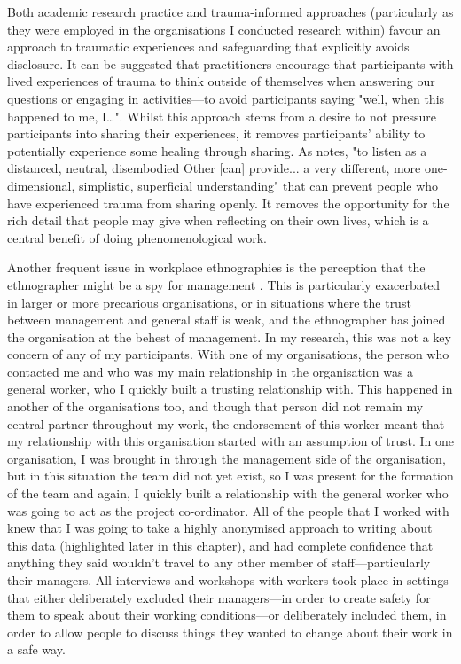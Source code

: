 Both academic research practice and trauma-informed approaches (particularly as they were employed in the organisations I conducted research within) favour an approach to traumatic experiences and safeguarding that explicitly avoids disclosure. It can be suggested that practitioners encourage that participants with lived experiences of trauma to think outside of themselves when answering our questions or engaging in activities—to avoid participants saying "well, when this happened to me, I…". Whilst this approach stems from a desire to not pressure participants into sharing their experiences, it removes participants' ability to potentially experience some healing through sharing. As \citet[p. 56]{carless_narrating_2016} notes, "to listen as a distanced, neutral, disembodied Other [can] provide... a very different, more one-dimensional, simplistic, superficial understanding" that can prevent people who have experienced trauma from sharing openly. It removes the opportunity for the rich detail that people may give when reflecting on their own lives, which is a central benefit of doing phenomenological work.

Another frequent issue in workplace ethnographies is the perception that the ethnographer might be a spy for management \citep{baum-talmor_its_2019}. This is particularly exacerbated in larger or more precarious organisations, or in situations where the trust between management and general staff is weak, and the ethnographer has joined the organisation at the behest of management. In my research, this was not a key concern of any of my participants. With one of my organisations, the person who contacted me and who was my main relationship in the organisation was a general worker, who I quickly built a trusting relationship with. This happened in another of the organisations too, and though that person did not remain my central partner throughout my work, the endorsement of this worker meant that my relationship with this organisation started with an assumption of trust. In one organisation, I was brought in through the management side of the organisation, but in this situation the team did not yet exist, so I was present for the formation of the team and again, I quickly built a relationship with the general worker who was going to act as the project co-ordinator. All of the people that I worked with knew that I was going to take a highly anonymised approach to writing about this data (highlighted later in this chapter), and had complete confidence that anything they said wouldn’t travel to any other member of staff—particularly their managers. All interviews and workshops with workers took place in settings that either deliberately excluded their managers—in order to create safety for them to speak about their working conditions—or deliberately included them, in order to allow people to discuss things they wanted to change about their work in a safe way.  


